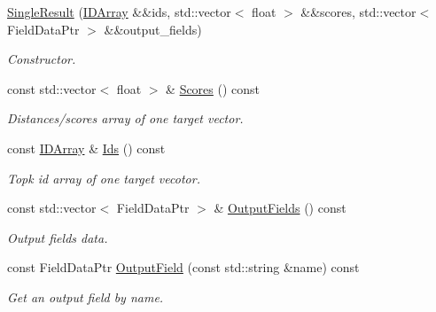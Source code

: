 \begin{DoxyCompactItemize}
\item 
\mbox{\label{structmilvus_1_1_single_result_ab22d2306df593a1ba47b6f8c464db90c}} 
\hyperlink{structmilvus_1_1_single_result_ab22d2306df593a1ba47b6f8c464db90c}{Single\+Result} (\hyperlink{classmilvus_1_1_i_d_array}{I\+D\+Array} \&\&ids, std\+::vector$<$ float $>$ \&\&scores, std\+::vector$<$ Field\+Data\+Ptr $>$ \&\&output\+\_\+fields)
\begin{DoxyCompactList}\small\item\em Constructor. \end{DoxyCompactList}\item 
\mbox{\label{structmilvus_1_1_single_result_a40265056460809a9b951b5ad99b8afaa}} 
const std\+::vector$<$ float $>$ \& \hyperlink{structmilvus_1_1_single_result_a40265056460809a9b951b5ad99b8afaa}{Scores} () const
\begin{DoxyCompactList}\small\item\em Distances/scores array of one target vector. \end{DoxyCompactList}\item 
\mbox{\label{structmilvus_1_1_single_result_a6685ef57bc00a67a615055305d23a920}} 
const \hyperlink{classmilvus_1_1_i_d_array}{I\+D\+Array} \& \hyperlink{structmilvus_1_1_single_result_a6685ef57bc00a67a615055305d23a920}{Ids} () const
\begin{DoxyCompactList}\small\item\em Topk id array of one target vecotor. \end{DoxyCompactList}\item 
\mbox{\label{structmilvus_1_1_single_result_abe8e800870319ea38ab3e907e116a0b0}} 
const std\+::vector$<$ Field\+Data\+Ptr $>$ \& \hyperlink{structmilvus_1_1_single_result_abe8e800870319ea38ab3e907e116a0b0}{Output\+Fields} () const
\begin{DoxyCompactList}\small\item\em Output fields data. \end{DoxyCompactList}\item 
\mbox{\label{structmilvus_1_1_single_result_a919949d8183f746982b8bb532012c4ba}} 
const Field\+Data\+Ptr \hyperlink{structmilvus_1_1_single_result_a919949d8183f746982b8bb532012c4ba}{Output\+Field} (const std\+::string \&name) const
\begin{DoxyCompactList}\small\item\em Get an output field by name. \end{DoxyCompactList}\end{DoxyCompactItemize}


